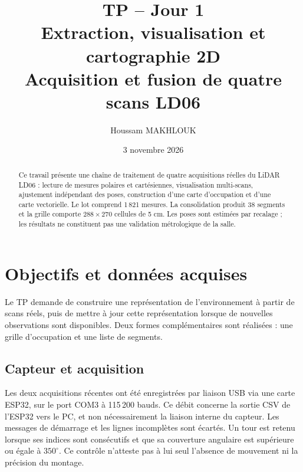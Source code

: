 \documentclass[11pt,a4paper]{article}
\title{TP -- Jour 1\\Extraction, visualisation et cartographie 2D\\\large Acquisition et fusion de quatre scans LD06}
\author{Houssam MAKHLOUK}
\date{3 novembre 2026}
\begin{document}
\maketitle
\begin{abstract}
Ce travail présente une chaîne de traitement de quatre acquisitions réelles du LiDAR LD06 : lecture de mesures polaires et cartésiennes, visualisation multi-scans, ajustement indépendant des poses, construction d'une carte d'occupation et d'une carte vectorielle. Le lot comprend 1\,821 mesures. La consolidation produit 38 segments et la grille comporte $288\times270$ cellules de 5 cm. Les poses sont estimées par recalage ; les résultats ne constituent pas une validation métrologique de la salle.
\end{abstract}
\tableofcontents
\newpage

\section{Objectifs et données acquises}
Le TP demande de construire une représentation de l'environnement à partir de scans réels, puis de mettre à jour cette représentation lorsque de nouvelles observations sont disponibles. Deux formes complémentaires sont réalisées : une grille d'occupation et une liste de segments.

\subsection{Capteur et acquisition}
Les deux acquisitions récentes ont été enregistrées par liaison USB via une carte ESP32, sur le port COM3 à 115\,200 bauds. Ce débit concerne la sortie CSV de l'ESP32 vers le PC, et non nécessairement la liaison interne du capteur. Les messages de démarrage et les lignes incomplètes sont écartés. Un tour est retenu lorsque ses indices sont consécutifs et que sa couverture angulaire est supérieure ou égale à $350^\circ$. Ce contrôle n'atteste pas à lui seul l'absence de mouvement ni la précision du montage.
\end{document}
